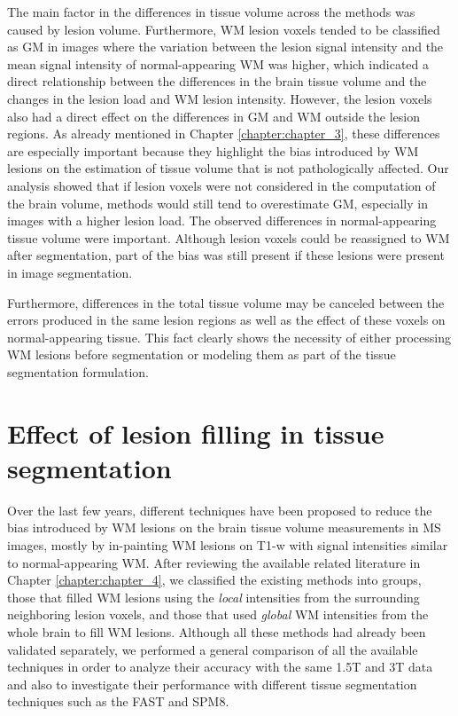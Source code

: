 The main factor in the differences in tissue volume across the methods was caused by lesion volume. Furthermore, WM lesion voxels tended to be classified as GM in images where the variation between the lesion signal intensity and the mean signal intensity of normal-appearing WM was higher, which indicated a direct relationship between the differences in the brain tissue volume and the changes in the lesion load and WM lesion intensity. However, the lesion voxels also had a direct effect on the differences in GM and WM outside the lesion regions. As already mentioned in Chapter \ref{chapter:chapter_3}, these differences are especially important because they highlight the bias introduced by WM lesions on the estimation of tissue volume that is not pathologically affected. Our analysis showed that if lesion voxels were not considered in the computation of the brain volume, methods would still tend to overestimate GM, especially in images with a higher lesion load. 
The observed differences in normal-appearing tissue volume were important. Although lesion voxels could be reassigned to WM after segmentation, part of the bias was still present if these lesions were present in image segmentation.

Furthermore, differences in the total tissue volume may be canceled between the errors produced in the same lesion regions as well as the effect of these voxels on normal-appearing tissue. This fact clearly shows the necessity of either processing WM lesions before segmentation or modeling them as part of the tissue segmentation formulation. 


\section{Effect of lesion filling in tissue segmentation}

Over the last few years, different techniques have been proposed to reduce the bias introduced by WM lesions on the brain tissue volume measurements in MS images, mostly by in-painting WM lesions on T1-w with signal intensities similar to normal-appearing WM.  After reviewing the  available related literature in Chapter \ref{chapter:chapter_4}, we classified the existing methods into groups, those that filled WM lesions using the \textit{local} intensities from the surrounding neighboring lesion voxels, and those that used \textit{global} WM intensities from the whole brain to fill WM lesions. Although all these methods had already been validated separately, we performed a general comparison of all the available techniques in order to analyze their accuracy with the same 1.5T and 3T data and also to investigate their performance with different tissue segmentation techniques such as the FAST and SPM8.

